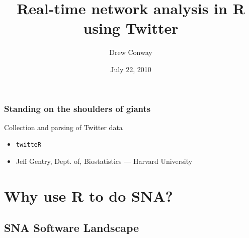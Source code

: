 \documentclass[xcolor=dvipsnames, 9pt]{beamer}
\title{Real-time network analysis in R using Twitter}
\author{Drew Conway}
\institute{New York University --- Department of Politics}
\date{July 22, 2010}
\begin{document}
 

\begin{frame}[plain]
  \titlepage  
\end{frame}

\begin{frame}[plain]
    \frametitle{Standing on the shoulders of giants}
    Collection and parsing of Twitter data
    \begin{itemize}
        \item \texttt{twitteR}
        \item Jeff Gentry, Dept. of, Biostatistics --- Harvard University
    \end{itemize}
\end{frame}


\section{Why use R to do SNA?} %
\label{sec:why_use_r_to_do_sna_}

\subsection{SNA Software Landscape} %
\label{sub:sna_software_landscape}
\end{document}
